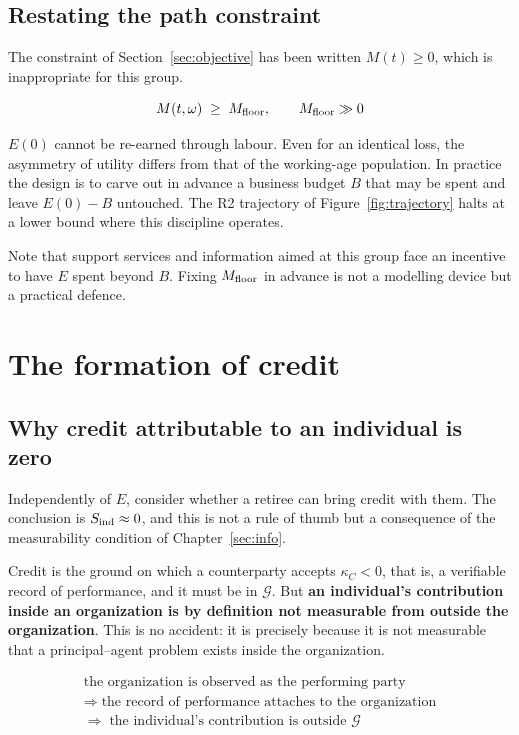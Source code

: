 \subsection{Restating the path constraint}

The constraint of Section~\ref{sec:objective} has been written $M(t)\geq 0$, which is
inappropriate for this group.

\begin{equation}
M(t,\omega) \;\geq\; M_{\rm floor}, \qquad M_{\rm floor} \gg 0
\end{equation}

$E(0)$ cannot be re-earned through labour. Even for an identical loss, the asymmetry of
utility differs from that of the working-age population. In practice the design is to carve
out in advance a business budget $B$ that may be spent and leave $E(0)-B$ untouched. The R2
trajectory of Figure~\ref{fig:trajectory} halts at a lower bound where this discipline
operates.

Note that support services and information aimed at this group face an incentive to have
$E$ spent beyond $B$. Fixing $M_{\rm floor}$ in advance is not a modelling device but a
practical defence.

\section{The formation of credit}
\label{sec:credit-formation}

\subsection{Why credit attributable to an individual is zero}

Independently of $E$, consider whether a retiree can bring credit with them. The conclusion
is $S_{\rm ind}\approx 0$, and this is not a rule of thumb but a consequence of the
measurability condition of Chapter~\ref{sec:info}.

Credit is the ground on which a counterparty accepts $\kappa_C<0$, that is, a verifiable
record of performance, and it must be in $\mathcal{G}$. But \textbf{an individual's
contribution inside an organization is by definition not measurable from outside the
organization}. This is no accident: it is precisely because it is not measurable that a
principal--agent problem exists inside the organization.

\begin{equation}
\begin{gathered}
\text{the organization is observed as the performing party}\\
\Rightarrow\; \text{the record of performance attaches to the organization}\\
\Rightarrow\; \text{the individual's contribution is outside } \mathcal{G}
\end{gathered}
\end{equation}

